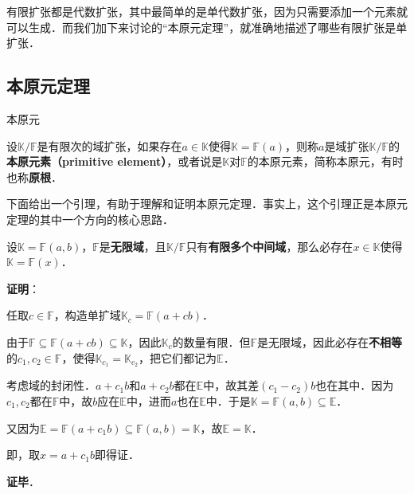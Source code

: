 

有限扩张都是代数扩张，其中最简单的是单代数扩张，因为只需要添加一个元素就可以生成．而我们加下来讨论的“本原元定理”，就准确地描述了哪些有限扩张是单扩张．

\subsection{本原元定理}

\begin{definition}{本原元}\label{PrmtEl_def1}

设$\mathbb{K}/\mathbb{F}$是有限次的域扩张，如果存在$a\in\mathbb{K}$使得$\mathbb{K}=\mathbb{F}(a)$，则称$a$是域扩张$\mathbb{K}/\mathbb{F}$的\textbf{本原元素（primitive element）}，或者说是$\mathbb{K}$对$\mathbb{F}$的本原元素，简称本原元，有时也称\textbf{原根}．

\end{definition}

下面给出一个引理，有助于理解和证明本原元定理．事实上，这个引理正是本原元定理的其中一个方向的核心思路．


\begin{lemma}{}\label{PrmtEl_lem1}
设$\mathbb{K}=\mathbb{F}(a, b)$，$\mathbb{F}$是\textbf{无限域}，且$\mathbb{K}/\mathbb{F}$只有\textbf{有限多个中间域}，那么必存在$x\in\mathbb{K}$使得$\mathbb{K}=\mathbb{F}(x)$．
\end{lemma}

\textbf{证明}：

任取$c\in\mathbb{F}$，构造单扩域$\mathbb{K}_c=\mathbb{F}(a+cb)$．

由于$\mathbb{F}\subseteq\mathbb{F}(a+cb)\subseteq\mathbb{K}$，因此$\mathbb{K}_c$的数量有限．但$\mathbb{F}$是无限域，因此必存在\textbf{不相等}的$c_1, c_2\in\mathbb{F}$，使得$\mathbb{K}_{c_1}=\mathbb{K}_{c_2}$，把它们都记为$\mathbb{E}$．

考虑域的封闭性．$a+c_1b$和$a+c_2b$都在$\mathbb{E}$中，故其差$(c_1-c_2)b$也在其中．因为$c_1, c_2$都在$\mathbb{F}$中，故$b$应在$\mathbb{E}$中，进而$a$也在$\mathbb{E}$中．于是$\mathbb{K}=\mathbb{F}(a, b)\subseteq\mathbb{E}$．

又因为$\mathbb{E}=\mathbb{F}(a+c_1b)\subseteq\mathbb{F}(a, b)=\mathbb{K}$，故$\mathbb{E}=\mathbb{K}$．

即，取$x=a+c_1b$即得证．



\textbf{证毕}．


